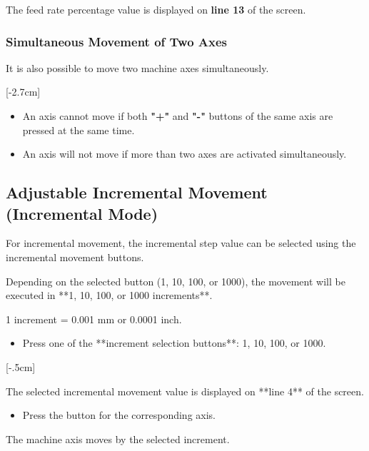 The feed rate percentage value is displayed on \textbf{line 13} of the screen.

\subsubsection*{Simultaneous Movement of Two Axes}

It is also possible to move two machine axes simultaneously.

[-2.7cm]

\begin{itemize}
    \item An axis cannot move if both \textbf{"+"} and \textbf{"-"} buttons of the same axis are pressed at the same time.
    \item An axis will not move if more than two axes are activated simultaneously.
\end{itemize}

\newpage
\subsection{Adjustable Incremental Movement (Incremental Mode)}

For incremental movement, the incremental step value can be selected using the incremental movement buttons.

Depending on the selected button (1, 10, 100, or 1000), the movement will be executed in **1, 10, 100, or 1000 increments**.

\begin{center}
    1 increment = 0.001 mm or 0.0001 inch.
\end{center}

\procedure

\begin{itemize}
    \item Press one of the **increment selection buttons**: 1, 10, 100, or 1000.
\end{itemize}

[-.5cm]

\noindent The selected incremental movement value is displayed on **line 4** of the screen.

\begin{itemize}
    \item Press the button for the corresponding axis.
\end{itemize}

The machine axis moves by the selected increment.

